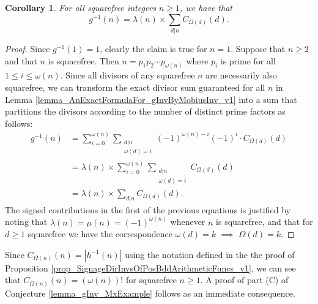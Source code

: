 \documentclass[11pt,reqno,a4letter]{article}
\numberwithin{figure}{section}
\numberwithin{table}{section}
\theoremstyle{plain}
\newtheorem{cor}[theorem]{Corollary}
\numberwithin{theorem}{section}
\theoremstyle{definition}
\begin{document}
\begin{cor} 
\label{cor_AnExactFormulaFor_gInvByMobiusInv_nSqFree_v2} 
For all squarefree integers $n \geq 1$, we have that 
\begin{equation} 
\label{eqn_gInvnSqFreeN_exactDivSum_Formula} 
g^{-1}(n) = \lambda(n) \times \sum_{d|n} C_{\Omega(d)}(d). 
\end{equation} 
\end{cor} 
\begin{proof} 
Since $g^{-1}(1) = 1$, clearly the claim is true for $n = 1$. Suppose that $n \geq 2$ and that 
$n$ is squarefree. Then $n = p_1p_2 \cdots p_{\omega(n)}$ where $p_i$ is prime for all 
$1 \leq i \leq \omega(n)$. Since all divisors of any squarefree $n$ are necessarily also squarefree, 
we can transform the exact divisor sum guaranteed for all $n$ in 
Lemma \ref{lemma_AnExactFormulaFor_gInvByMobiusInv_v1} into a sum that partitions the divisors 
according to the number of distinct prime factors as follows: 
\begin{align*} 
g^{-1}(n) & = \sum_{i=0}^{\omega(n)} \sum_{\substack{d|n \\ \omega(d)=i}} (-1)^{\omega(n) - i} (-1)^{i} \cdot 
     C_{\Omega(d)}(d) \\ 
     & = \lambda(n) \times \sum_{i=0}^{\omega(n)} \sum_{\substack{d|n \\ \omega(d)=i}} C_{\Omega(d)}(d) \\ 
     & = \lambda(n) \times \sum_{d|n} C_{\Omega(d)}(d). 
\end{align*} 
The signed contributions in the first of the previous equations is 
justified by noting that $\lambda(n) = \mu(n) = (-1)^{\omega(n)}$ 
whenever $n$ is squarefree, and that for $d \geq 1$
squarefree we have the correspondence 
$\omega(d) = k$ $\implies$ $\Omega(d) = k$. 
\end{proof} 

Since $C_{\Omega(n)}(n) = |h^{-1}(n)|$ using the notation defined in the the proof of 
Proposition \ref{prop_SignageDirInvsOfPosBddArithmeticFuncs_v1}, we can see that 
$C_{\Omega(n)}(n) = (\omega(n))!$ for squarefree $n \geq 1$. 
A proof of part (C) of Conjecture \ref{lemma_gInv_MxExample} 
follows as an immediate consequence. 
\end{document}
